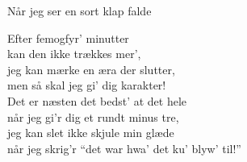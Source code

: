 \begin{song}{Når jeg ser en sort klap falde}
  \begin{SBVerse}
    Efter femogfyr’ minutter\\
    kan den ikke trækkes mer’,\\
    jeg kan mærke en æra der slutter,\\
    men så skal jeg gi’ dig karakter!\\
    Det er næsten det bedst’ at det hele\\
    når jeg gi’r dig et rundt minus tre,\\
    jeg kan slet ikke skjule min glæde\\
    når jeg skrig’r “det war hwa’ det ku’ blyw’ til!”
  \end{SBVerse}
\end{song}
